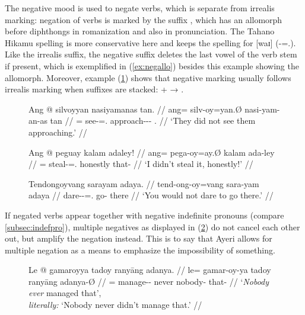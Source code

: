 The negative mood is used to negate verbs, which is separate from irrealis
marking: negation of verbs is marked by the suffix , which has
an allomorph  before diphthongs in romanization and also in
pronunciation. The Tahano Hikamu spelling is more conservative here and keeps
the spelling   for [waɪ]
(\mbox{-\Neg{}=\Fsg{}.\Top{}}). Like the irrealis suffix, the
negative suffix deletes the last vowel of the verb stem if present, which is
exemplified in (\ref{ex:negallo}) besides this example showing the 
allomorph. Moreover, example (\ref{ex:irrneg}) shows that negative marking
usually follows irrealis marking when suffixes are stacked:  +
 → .

\begin{figure}[h]
\pex
\a\label{ex:negative}\begingl
	\gla Ang @ silvoyyan nasiyamanas tan. //
	\glb ang= silv-oy=yan.Ø nasi-yam-an-as tan //
	\glc \AgtT{}= see-\Neg{}=\TplM{}.\Top{} approach-\Ptcp{}-\Nmlz{}-\Parg{} 
		\TplM{}.\Gen{} //
	\glft `They did not see them approaching.' //
\endgl

\a\label{ex:negallo}\begingl
	\gla Ang @ peguay kalam adaley! //
	\glb ang= pega-oy=ay.Ø kalam ada-ley //
	\glc \AgtT{}= steal-\Neg{}=\Fsg{}.\Top{} honestly that-\PargI{} //
	\glft `I didn't steal it, honestly!' //
\endgl

\a\label{ex:irrneg}\begingl
	\gla Tendongoyvang sarayam adaya. //
	\glb tend-ong-oy=vang sara-yam adaya //
	\glc dare-\Irr{}-\Neg{}=\Second{}.\Aarg{} go-\Ptcp{} there //
	\glft `You would not dare to go there.' //
\endgl
\xe
\end{figure}

If negated verbs appear together with negative indefinite pronouns (compare 
\autoref{subsec:indefpro}), multiple negatives as displayed in
(\ref{ex:dblneg}) do not cancel each other out, but amplify the negation
instead. This is to say that Ayeri allows for multiple
negation as a means to emphasize the impossibility of something.

\begin{figure}[h]
\ex\label{ex:dblneg}
\begingl
	\gla Le @ gamaroyya tadoy ranyāng adanya. //
	\glb le= gamar-oy-ya tadoy ranyāng adanya-Ø //
	\glc \PatTI{}= manage-\Neg{}-\TsgM{} never nobody-\Aarg{} that-\Top{} //
	\glft `\emph{Nobody ever} managed that',\\
		\textit{literally:} `Nobody never didn't manage that.' //
\endgl
\xe
\end{figure}

